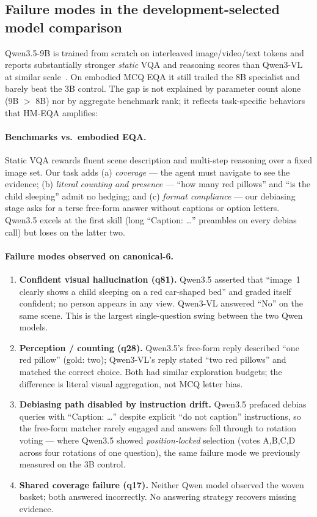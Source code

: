 \subsection{Failure modes in the development-selected model comparison}
\label{app:model_choice_failures}

Qwen3.5-9B is trained from scratch on interleaved image/video/text tokens and reports
substantially stronger \emph{static} VQA and reasoning scores than Qwen3-VL at similar
scale~\citep{qwen35}. On embodied MCQ EQA it still trailed the 8B specialist and barely
beat the 3B control. The gap is not explained by parameter count alone (9B $>$ 8B) nor by
aggregate benchmark rank; it reflects task-specific behaviors that HM-EQA amplifies:

\paragraph{Benchmarks vs.\ embodied EQA.}
Static VQA rewards fluent scene description and multi-step reasoning over a fixed image
set. Our task adds (a) \emph{coverage} --- the agent must navigate to see the evidence;
(b) \emph{literal counting and presence} --- ``how many red pillows'' and ``is the child
sleeping'' admit no hedging; and (c) \emph{format compliance} --- our debiasing stage
asks for a terse free-form answer without captions or option letters. Qwen3.5 excels at
the first skill (long ``Caption: \ldots'' preambles on every debias call) but loses on
the latter two.

\paragraph{Failure modes observed on canonical-6.}
\begin{enumerate}
  \item \textbf{Confident visual hallucination (q81).} Qwen3.5 asserted that ``image~1
  clearly shows a child sleeping on a red car-shaped bed'' and graded itself confident;
  no person appears in any view. Qwen3-VL answered ``No'' on the same scene. This is the
  largest single-question swing between the two Qwen models.
  \item \textbf{Perception / counting (q28).} Qwen3.5's free-form reply described ``one
  red pillow'' (gold: two); Qwen3-VL's reply stated ``two red pillows'' and matched the
  correct choice. Both had similar exploration budgets; the difference is literal visual
  aggregation, not MCQ letter bias.
  \item \textbf{Debiasing path disabled by instruction drift.} Qwen3.5 prefaced debias
  queries with ``Caption: \ldots'' despite explicit ``do not caption'' instructions, so
  the free-form matcher rarely engaged and answers fell through to rotation voting ---
  where Qwen3.5 showed \emph{position-locked} selection (votes A,B,C,D across four
  rotations of one question), the same failure mode we previously measured on the 3B
  control.
  \item \textbf{Shared coverage failure (q17).} Neither Qwen model observed the woven
  basket; both answered incorrectly. No answering strategy recovers missing evidence.
\end{enumerate}

